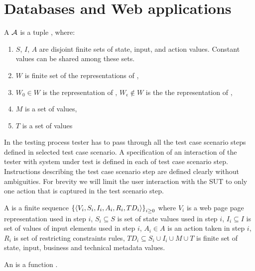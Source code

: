 \chapter{Databases and Web applications}
\begin{defi}
A  $\mathcal{A}$ is a tuple , where:
\begin{enumerate}
\item $S$, $I$, $A$ are disjoint finite sets of state, input, and action values. Constant values can be shared among these sets.
\item $W$ is finite set of the representations of ,
\item $W_0\in W$ is the representation of , $W_{\epsilon}\notin W$ is the the representation of ,
\item $M$ is a set of  values,
\item $T$ is a set of  values
\end{enumerate}
In the testing process tester has to pass through all the test case scenario steps defined in selected test case scenario. A specification of an interaction of the tester with system under test is defined in each of test case scenario step. Instructions describing the test case scenario step are defined clearly without ambiguities. For brevity we will limit the user interaction with the SUT to only one action that is captured in the test scenario step.
\cite{conf/fedcsis/FrajtakBJ12}
\end{defi}

\begin{defi}
A  is a finite sequence $\left\{ \left\langle V_i,S_i,I_i,A_i,R_i,TD_i\right\rangle\right\}_{i\geq 0}$ where $V_i$ is a web page page representation used in step $i$, $S_i\subseteq S$ is set of state values used in step $i$, $I_i\subseteq I$ is set of values of input elements used in step $i$, $A_i\in A$ is an action taken in step $i$, $R_i$ is set of restricting constraints rules, $TD_i\subseteq S_i\cup I_i\cup M\cup T$ is finite set of state, input, business and technical metadata values.
\cite{conf/fedcsis/FrajtakBJ12}
\end{defi}

\begin{defi}
An  is a function .
\cite{conf/fedcsis/FrajtakBJ12}
\end{defi}

